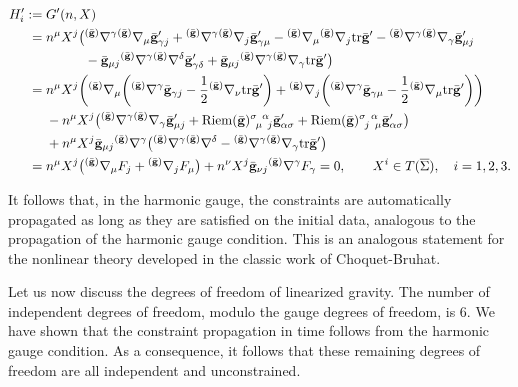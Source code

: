 \documentclass[pdftex]{sigma}
\def\olin#1{\overline{#1}{}}%
\def\grad{{\nabla}}%
\newcommand{\leftexp}[2]{{\vphantom{#2}}^{#1}{#2}}
\def\halb{\frac{1}{2}}%
\def \gm{\gamma}
\def \a{\alpha}
\renewcommand{\gg}{{\bf g}}
\newcommand{\bgg}{{\bar{\bf g}}}
\renewcommand{\a}{\alpha}
\renewcommand{\d}{\delta}
\numberwithin{equation}{section}
\begin{document}
\begin{align*}
 H'_i :={}& G' (n, X) \notag\\
 ={}& n^\mu X^j \bigl(\leftexp{(\bgg)}{\grad}^\gm \leftexp{(\bgg)}{\grad}_\mu \bgg'_{ \gm j} + \leftexp{(\bgg)}{\grad}^\gm \leftexp{(\bgg)}{\grad}_j \bgg'_{\gm \mu} - \leftexp{(\bgg)}{\grad}_\mu \leftexp{(\bgg)}{\grad}_j {\rm tr}\bgg' - \leftexp{(\bgg)}{\grad}^\gm \leftexp{(\bgg)}{\grad}_\gm \bgg'_{ \mu j} \notag\\
 & \hphantom{n^\mu X^j \bigl(}{} - \bgg_{\mu j} \leftexp{(\bgg)}{\grad}^\gm \leftexp{(\bgg)}{\grad}^\d \bgg'_{ \gm \d} + \bgg_{\mu j} \leftexp{(\bgg)}{\grad}^\gm \leftexp{(\bgg)}{\grad}_\gm {\rm tr} \bgg' \bigr) \notag\\
 ={}& n^\mu X^j \biggl(\leftexp{(\bgg)}{\grad}_\mu \biggl(\leftexp{(\bgg)}{\grad}^\gm \bgg_{\gm j} - \halb \leftexp{(\bgg)}{\grad}_\nu {\rm tr}\bgg' \biggr) + \leftexp{(\bgg)}{\grad}_j \biggl(\leftexp{(\bgg)}{\grad}^\gm \bgg_{\gm \mu} - \halb \leftexp{(\bgg)}{\grad}_\mu {\rm tr}\bgg' \biggr) \biggr) \notag\\
 & - n^\mu X^j \bigl(\leftexp{(\bgg)}{\grad}^\gm \leftexp{(\bar{\gg})}{\grad}_\gm \bgg'_{\mu j} + {\rm Riem}(\bgg)^{\sigma \,\,\,\a}_{\,\,\,\mu\,\,\,j} \bgg'_{\a \sigma} + {\rm Riem}(\bgg)^{\sigma \,\,\,\a}_{\,\,\,j\,\,\,\mu} \bgg'_{\a \sigma} \bigr) \notag\\
 & + n^ \mu X^j \bgg_{ \mu j} \leftexp{(\bgg)}{\grad}^\gm \bigl(\leftexp{(\bgg)}{\grad}^\gm \leftexp{(\bgg)}{\grad}^\d - \leftexp{(\bgg)}{\grad}^\gm \leftexp{(\bgg)}{\grad}_\gm {\rm tr}\bgg' \bigr)
 \notag\\
 ={}& n^ \mu X^j \bigl(\leftexp{(\bgg)}{\grad}_\mu F_j + \leftexp{(\bgg)}{\grad}_j F_\mu \bigr) + n^\nu X^j \bgg_{ \nu j} \leftexp{(\bgg)}{\grad}^\gm F_\gm =0, \qquad X^i \in T(\olin{\Sigma}),\quad i= 1, 2, 3.
\end{align*}

It follows that, in the harmonic gauge, the constraints are automatically propagated as long as they are satisfied on the initial data, analogous to the propagation of the harmonic gauge condition. This is an analogous statement for the nonlinear theory developed in the classic work of Choquet-Bruhat.

Let us now discuss the degrees of freedom of linearized gravity. The number of independent
degrees of freedom, modulo the gauge degrees of freedom, is 6. We have shown that the constraint propagation in time follows from the harmonic gauge condition. As a consequence, it follows that these remaining degrees of freedom are all independent and unconstrained.
\end{document}
